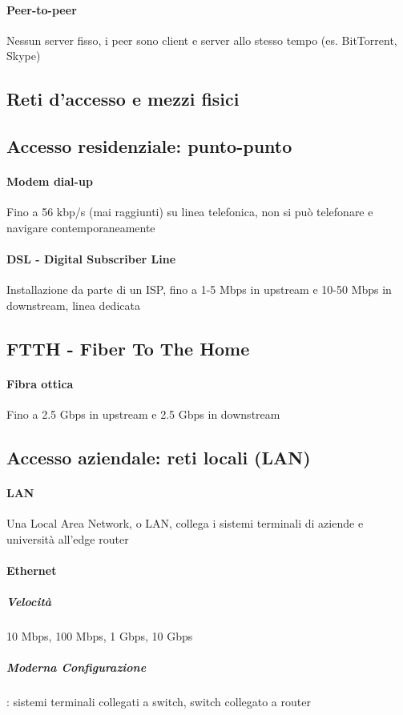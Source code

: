         \paragraph{Peer-to-peer} Nessun server fisso, i peer sono client e server allo stesso tempo (es. BitTorrent, Skype)
        \subsection{Reti d’accesso e mezzi fisici}
        \subsection{Accesso residenziale: punto-punto}
            \paragraph{Modem dial-up} Fino a 56 kbp/s (mai raggiunti) su linea telefonica, non si può telefonare e navigare contemporaneamente
            \paragraph{\Acrshort*{DSL} - Digital Subscriber Line} Installazione da parte di un \Acrshort*{ISP}, fino a 1-5 Mbps in upstream e 10-50 Mbps in downstream, linea dedicata
        \subsection[FTTH - Fiber To The Home]{\Acrshort*{FTTH} - Fiber To The Home}
            \paragraph{Fibra ottica} Fino a 2.5 Gbps in upstream e 2.5 Gbps in downstream
        \subsection[Accesso aziendale: reti locali (LAN)]{Accesso aziendale: reti locali (\Acrshort*{LAN})}
            \paragraph{\Acrshort*{LAN}} Una Local Area Network, o LAN, collega i sistemi terminali di aziende e università all’edge router
            \paragraph{Ethernet} 
                \subparagraph{Velocità} 10 Mbps, 100 Mbps, 1 Gbps, 10 Gbps 
                \subparagraph{Moderna Configurazione}: sistemi terminali collegati a switch, switch collegato a router 

